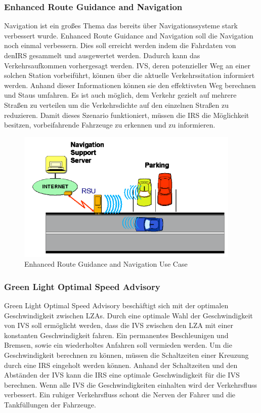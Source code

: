 \subsubsection{Enhanced Route Guidance and Navigation}
Navigation ist ein großes Thema das bereits über Navigationssysteme stark verbessert wurde. Enhanced Route Guidance and Navigation soll die Navigation noch einmal verbessern. Dies soll erreicht werden indem die Fahrdaten von den\ac{IRS} gesammelt und ausgewertet werden. Dadurch kann das Verkehrsaufkommen vorhergesagt werden. \ac{IVS}, deren potenzieller Weg an einer solchen Station vorbeiführt, können über die aktuelle Verkehrssitation informiert werden. Anhand dieser Informationen können sie den effektivsten Weg berechnen und Staus umfahren. Es ist auch möglich, dem Verkehr gezielt auf mehrere Straßen zu verteilen um die Verkehrsdichte auf den einzelnen Straßen zu reduzieren. Damit dieses Szenario funktioniert, müssen die \ac{IRS} die Möglichkeit besitzen, vorbeifahrende Fahrzeuge zu erkennen und zu informieren. 

\begin{figure}[htbp]
\includegraphics[width=0.95\textwidth]{content/images/06_use_cases/ergn.png}
\caption{Enhanced Route Guidance and Navigation Use Case \cite{etsi102638}}
\label{fig:ergn}
\end{figure}
\subsubsection{Green Light Optimal Speed Advisory}
Green Light Optimal Speed Advisory beschäftigt sich mit der optimalen Geschwindigkeit zwischen \acp{LZA}. Durch eine optimale Wahl der Geschwindigkeit von \ac{IVS} soll ermöglicht werden, dass die \ac{IVS} zwischen den \ac{LZA} mit einer konstanten Geschwindigkeit fahren. Ein permanentes Beschleunigen und Bremsen, sowie ein wiederholtes Anfahren soll vermieden werden. Um die Geschwindigkeit berechnen zu können, müssen die Schaltzeiten einer Kreuzung durch eine \ac{IRS} eingeholt werden können. Anhand der Schaltzeiten und den Abständen der \ac{IVS} kann die \ac{IRS} eine optimale Geschwindigkeit für die \ac{IVS} berechnen. Wenn alle \ac{IVS} die Geschwindigkeiten einhalten wird der Verkehrsfluss verbessert. Ein ruhiger Verkehrsfluss schont die Nerven der Fahrer und die Tankfüllungen der Fahrzeuge.

